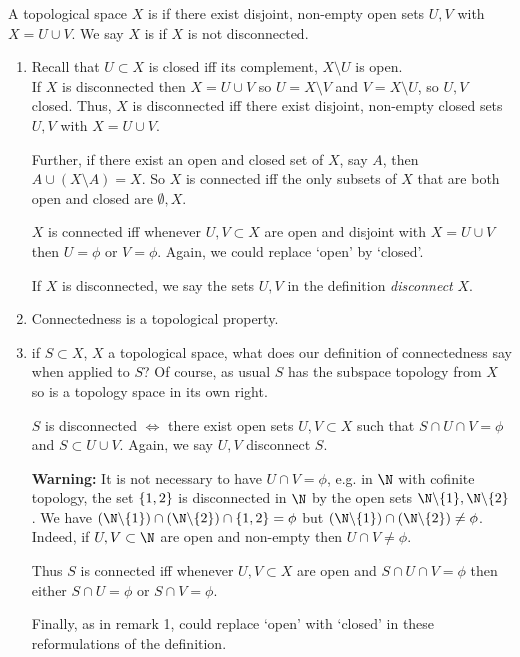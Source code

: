 \begin{definition}[Connectedness]
A topological space $X$ is  if there exist disjoint, non-empty open sets $U,V$ with $X = U\cup V$.
We say $X$ is  if $X$ is not disconnected.
\end{definition}

\begin{remark}
    \begin{enumerate}
        \item Recall that $U\subset X$ is closed iff its complement, $X \setminus U$ is open. \\
        If $X$ is disconnected then $X = U \cup V$ so $U = X \setminus V$ and $V = X \setminus U$, so $U, V$ closed.
        Thus, $X$ is disconnected iff there exist disjoint, non-empty closed sets $U,V$ with $X = U\cup V$.
        
        Further, if there exist an open and closed set of $X$, say $A$, then $A \cup (X \setminus A) = X$.
        So $X$ is connected iff the only subsets of $X$ that are both open and closed are $\emptyset, X$.
        
        $X$ is connected iff whenever $U,V\subset X$ are open and disjoint with $X=U\cup V$ then $U=\phi$ or $V=\phi$. Again, we could replace `open' by `closed'.

        If $X$ is disconnected, we say the sets $U,V$ in the definition \emph{disconnect} $X$.

        \item Connectedness is a topological property.
        \item if $S\subset X$, $X$ a topological space, what does our definition of connectedness say when applied to $S$? Of course, as usual $S$ has the subspace topology from $X$ so is a topology space in its own right. 

        $S$ is disconnected $\Leftrightarrow$ there exist open sets $U,V\subset X$ such that $S\cap U\cap V = \phi$ and $S\subset U\cup V$. Again, we say $U,V$ disconnect $S$.
        
        \textbf{\color{red} Warning:} It is not necessary to have $U\cap V =\phi$, e.g. in $\N$ with cofinite topology, the set $\{1,2\}$ is disconnected in $\N$ by the open sets $\N\backslash \set{1}, \N\backslash \set{2}$. We have $(\N\backslash \set{1}) \cap (\N\backslash \set{2})\cap \set{1,2} = \phi$ but $(\N\backslash \set{1})\cap (\N\backslash \set{2}) \neq \phi$. Indeed, if $U,V\subset \N$ are open and non-empty then $U\cap V\neq\phi$. 
        
        Thus $S$ is connected iff whenever $U,V\subset X$ are open and $S\cap U\cap V=\phi$ then either $S\cap U=\phi$ or $S\cap V=\phi.$
        
        Finally, as in remark 1, could replace `open' with `closed' in these reformulations of the definition.
    \end{enumerate} 
\end{remark}

